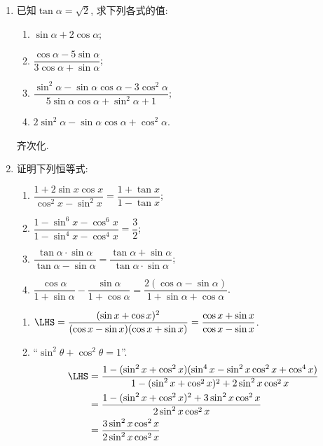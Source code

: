 \begin{enumerate}
\item 已知$\tan\alpha=\sqrt{2}$, 求下列各式的值:
\begin{enumerate}[(1)]
\item $\sin\alpha+2\cos\alpha$; 
\item $\dfrac{\cos\alpha-5\sin\alpha}{3\cos\alpha+\sin\alpha}$; 
\item $\dfrac{\sin^2\alpha-\sin\alpha\cos\alpha-3\cos^2\alpha}{5\sin\alpha\cos\alpha+\sin^2\alpha+1}$; 
\item $2\sin^2\alpha-\sin\alpha\cos\alpha+\cos^2\alpha$. 
\end{enumerate}
\begin{jieda}
齐次化. \\
\end{jieda}

\item 证明下列恒等式: 
\begin{enumerate}[(1)]
\item $\dfrac{1+2\sin{x}\cos{x}}{\cos^2x-\sin^2x}=\dfrac{1+\tan{x}}{1-\tan{x}}$; 
\item $\dfrac{1-\sin^6x-\cos^6x}{1-\sin^4x-\cos^4x}=\dfrac{3}{2}$;
\item $\dfrac{\tan\alpha\cdot\sin\alpha}{\tan\alpha-\sin\alpha}=\dfrac{\tan\alpha+\sin\alpha}{\tan\alpha\cdot\sin\alpha}$; 
\item $\dfrac{\cos\alpha}{1+\sin\alpha}-\dfrac{\sin\alpha}{1+\cos\alpha}=\dfrac{2(\cos\alpha-\sin\alpha)}{1+\sin\alpha+\cos\alpha}$. 
\end{enumerate}
\begin{jieda}
\begin{enumerate}[(1)]
\item $\LHS=\dfrac{(\sin{x}+\cos{x})^2}{(\cos{x}-\sin{x})(\cos{x}+\sin{x})}=\dfrac{\cos{x}+\sin{x}}{\cos{x}-\sin{x}}$. 

\item ``$\sin^2\theta+\cos^2\theta=1$''. 
\begin{align*}
\LHS & = \dfrac{1-(\sin^2x+\cos^2x)(\sin^4x-\sin^2x\cos^2x+\cos^4x)}{1-(\sin^2x+\cos^2x)^2+2\sin^2x\cos^2x}\\
& = \dfrac{1-(\sin^2x+\cos^2x)^2+3\sin^2x\cos^2x}{2\sin^2x\cos^2x}\\
& = \dfrac{3\sin^2x\cos^2x}{2\sin^2x\cos^2x}
\end{align*}


\end{enumerate}
\end{jieda}
\end{enumerate}
